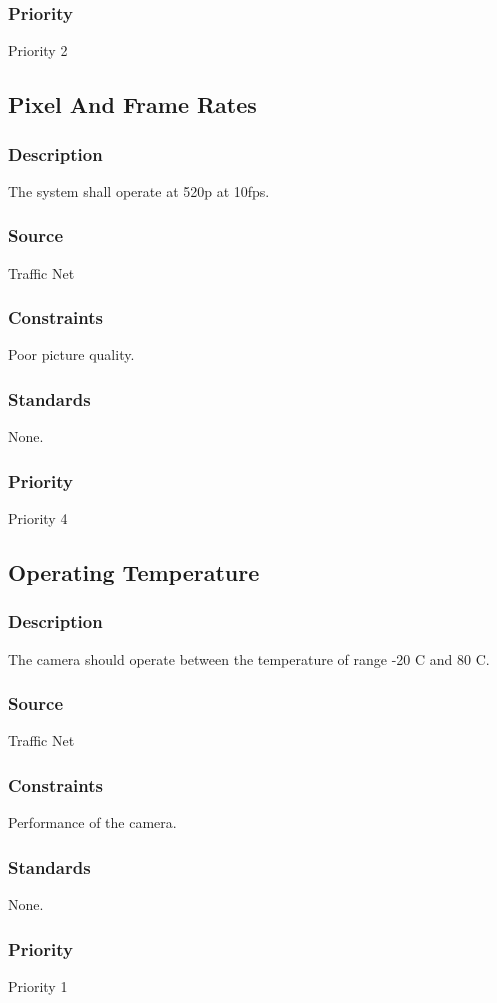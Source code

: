 \subsubsection{Priority}
Priority 2

\subsection{Pixel And Frame Rates}
\subsubsection{Description}
The system shall operate at 520p at 10fps.
\subsubsection{Source}
Traffic Net
\subsubsection{Constraints}
Poor picture quality.
\subsubsection{Standards}
None.
\subsubsection{Priority}
Priority 4

\subsection{Operating Temperature}
\subsubsection{Description}
The camera should operate between the temperature of range -20 C and 80 C.
\subsubsection{Source}
Traffic Net
\subsubsection{Constraints}
Performance of the camera.
\subsubsection{Standards}
None.
\subsubsection{Priority}
Priority 1


